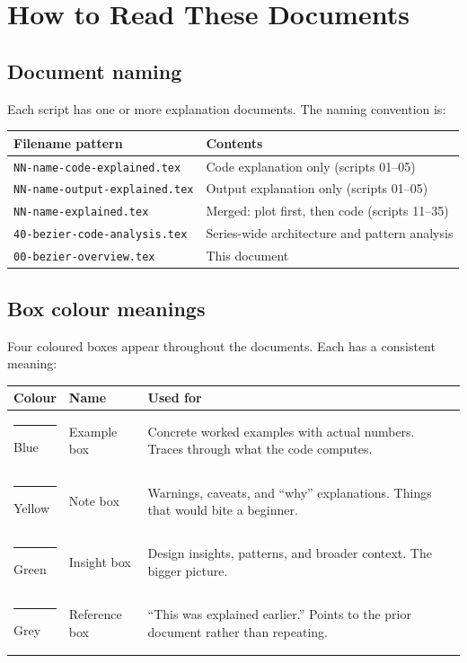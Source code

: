 \documentclass[12pt, a4paper]{article}
\newcommand{\cd}[1]{\texttt{#1}}
\begin{document}
\section{How to Read These Documents}

\subsection{Document naming}

Each script has one or more explanation documents.
The naming convention is:

\begin{center}
\begin{tabular}{lp{8.5cm}}
\toprule
Filename pattern & Contents \\
\midrule
\cd{NN-name-code-explained.tex} &
  Code explanation only (scripts 01--05) \\
\cd{NN-name-output-explained.tex} &
  Output explanation only (scripts 01--05) \\
\cd{NN-name-explained.tex} &
  Merged: plot first, then code (scripts 11--35) \\
\cd{40-bezier-code-analysis.tex} &
  Series-wide architecture and pattern analysis \\
\cd{00-bezier-overview.tex} &
  This document \\
\bottomrule
\end{tabular}
\end{center}

\subsection{Box colour meanings}

Four coloured boxes appear throughout the documents.
Each has a consistent meaning:

\begin{center}
\begin{tabular}{p{1.8cm}p{3cm}p{7cm}}
\toprule
Colour & Name & Used for \\
\midrule
\cellcolor{examplebg}\textcolor{examplerule}{\rule{6pt}{6pt}}
  Blue &
  Example box &
  Concrete worked examples with actual numbers.
  Traces through what the code computes. \\[6pt]
\cellcolor{notebg}\textcolor{noterule}{\rule{6pt}{6pt}}
  Yellow &
  Note box &
  Warnings, caveats, and ``why'' explanations.
  Things that would bite a beginner. \\[6pt]
\cellcolor{diffbg}\textcolor{diffrule}{\rule{6pt}{6pt}}
  Green &
  Insight box &
  Design insights, patterns, and broader context.
  The bigger picture. \\[6pt]
\cellcolor{samebg}\textcolor{samerule}{\rule{6pt}{6pt}}
  Grey &
  Reference box &
  ``This was explained earlier.''
  Points to the prior document rather than repeating. \\
\bottomrule
\end{tabular}
\end{center}
\end{document}
